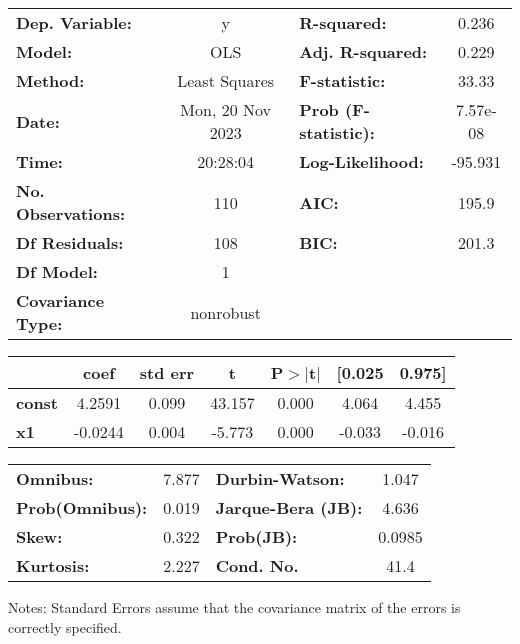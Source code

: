 \begin{center}
\begin{tabular}{lclc}
\toprule
\textbf{Dep. Variable:}    &        y         & \textbf{  R-squared:         } &     0.236   \\
\textbf{Model:}            &       OLS        & \textbf{  Adj. R-squared:    } &     0.229   \\
\textbf{Method:}           &  Least Squares   & \textbf{  F-statistic:       } &     33.33   \\
\textbf{Date:}             & Mon, 20 Nov 2023 & \textbf{  Prob (F-statistic):} &  7.57e-08   \\
\textbf{Time:}             &     20:28:04     & \textbf{  Log-Likelihood:    } &   -95.931   \\
\textbf{No. Observations:} &         110      & \textbf{  AIC:               } &     195.9   \\
\textbf{Df Residuals:}     &         108      & \textbf{  BIC:               } &     201.3   \\
\textbf{Df Model:}         &           1      & \textbf{                     } &             \\
\textbf{Covariance Type:}  &    nonrobust     & \textbf{                     } &             \\
\bottomrule
\end{tabular}
\begin{tabular}{lcccccc}
               & \textbf{coef} & \textbf{std err} & \textbf{t} & \textbf{P$> |$t$|$} & \textbf{[0.025} & \textbf{0.975]}  \\
\midrule
\textbf{const} &       4.2591  &        0.099     &    43.157  &         0.000        &        4.064    &        4.455     \\
\textbf{x1}    &      -0.0244  &        0.004     &    -5.773  &         0.000        &       -0.033    &       -0.016     \\
\bottomrule
\end{tabular}
\begin{tabular}{lclc}
\textbf{Omnibus:}       &  7.877 & \textbf{  Durbin-Watson:     } &    1.047  \\
\textbf{Prob(Omnibus):} &  0.019 & \textbf{  Jarque-Bera (JB):  } &    4.636  \\
\textbf{Skew:}          &  0.322 & \textbf{  Prob(JB):          } &   0.0985  \\
\textbf{Kurtosis:}      &  2.227 & \textbf{  Cond. No.          } &     41.4  \\
\bottomrule
\end{tabular}
\end{center}

Notes: \newline
 [1] Standard Errors assume that the covariance matrix of the errors is correctly specified.